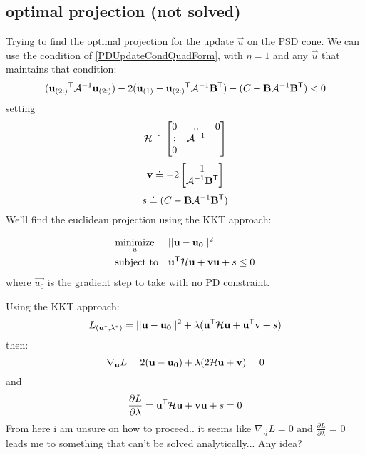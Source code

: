 \subsection{optimal projection (not solved)}
Trying to find the optimal projection for the update $\vec{u}$ on the PSD cone. 
We can use the condition of \eqref{PDUpdateCondQuadForm}, with $\eta = 1$ and any $\vec{u}$ that maintains that condition:
\begin{equation}
(\mathbf{u}_{(2:)}{}^\mathsf{T} \mathcal{A}^{-1} \mathbf{u}_{(2:)}) - 2(\mathbf{u}_{(1)} - \mathbf{u}_{(2:)}{}^\mathsf{T} \mathcal{A}^{-1}\mathbf{B{}^\mathsf{T}}) -   (C - \mathbf{B}  \mathcal{A}^{-1} \mathbf{B}{}^\mathsf{T}) < 0
\label{PDUpdateCondQuadFormWithU}
\end{equation}
setting
\begin{equation}
\mathcal{H} \doteq \left[ \begin{matrix} 0 &  . . & 0 \\ : &  \mathcal{A}^{-1}  \\ 0 & \end{matrix} \right]
\end{equation}
\begin{equation}
\mathbf{v} \doteq -2\left[ \begin{matrix} 1 \\ \mathcal{A}^{-1}\mathbf{B{}^\mathsf{T}}  \end{matrix} \right]
\end{equation}
\begin{equation}
s \doteq (C - \mathbf{B}  \mathcal{A}^{-1} \mathbf{B}{}^\mathsf{T})
\end{equation}
We'll find the euclidean projection using the KKT approach:

\begin{equation}
\begin{aligned}
& \underset{u}{\text{minimize}}
& & ||\mathbf{u} - \mathbf{u_0}||^2 \\
& \text{subject to}
& & \mathbf{u}{}^\mathsf{T} \mathcal{H} \mathbf{u} + \mathbf{v}\mathbf{u}+s \leq 0
\end{aligned}
\end{equation}
where $\vec{u_0}$ is the gradient step to take with no PD constraint. 

Using the KKT approach:
\begin{equation}
L_{(\mathbf{u}^*, \lambda^*)} = ||\mathbf{u} - \mathbf{u_0}||^2 + \lambda ( \mathbf{u}{}^\mathsf{T} \mathcal{H} \mathbf{u} + \mathbf{u}{}^\mathsf{T}\mathbf{v}+s )
\end{equation}
then: 
\begin{equation}
\nabla_{\mathbf{u}} L = 2(\mathbf{u} - \mathbf{u_0}) + \lambda(2\mathcal{H}\mathbf{u} + \mathbf{v}) = 0
\end{equation}
and
\begin{equation}
\frac{\partial {L}}{\partial \lambda} =   \mathbf{u}{}^\mathsf{T} \mathcal{H} \mathbf{u} + \mathbf{v}\mathbf{u}+s = 0
\end{equation}
From here i am unsure on how to proceed..
it seems like $\nabla_{\vec{u}} L = 0 $ and $\frac{\partial {L}}{\partial \lambda}$ = 0 leads me to something that can't be solved analytically...
Any idea?



